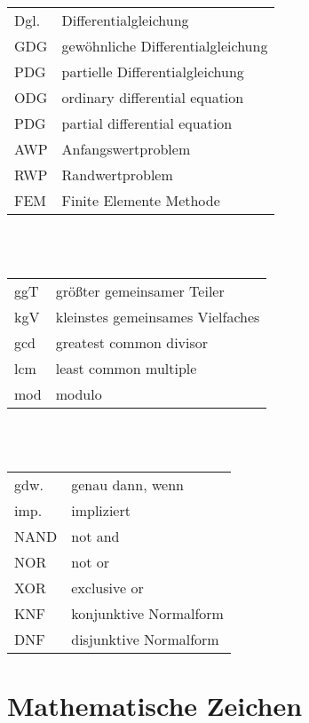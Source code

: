 \\[2pt]
\begin{tabular}{ll}
Dgl. & Differentialgleichung\\
GDG & gewöhnliche Differentialgleichung\\
PDG & partielle Differentialgleichung\\
ODG & ordinary differential equation\\
PDG & partial differential equation\\
AWP & Anfangswertproblem\\
RWP & Randwertproblem\\
FEM & Finite Elemente Methode
\end{tabular}\\[4pt]
\\[2pt]
\begin{tabular}{ll}
ggT & größter gemeinsamer Teiler\\
kgV & kleinstes gemeinsames Vielfaches\\
gcd & greatest common divisor\\
lcm & least common multiple\\
mod & modulo
\end{tabular}\\[4pt]
\\[2pt]
\begin{tabular}{ll}
gdw. & genau dann, wenn\\
imp. & impliziert\\
NAND & not and\\
NOR & not or\\
XOR & exclusive or\\
KNF & konjunktive Normalform\\
DNF & disjunktive Normalform
\end{tabular}

\newpage
\section{Mathematische Zeichen}

